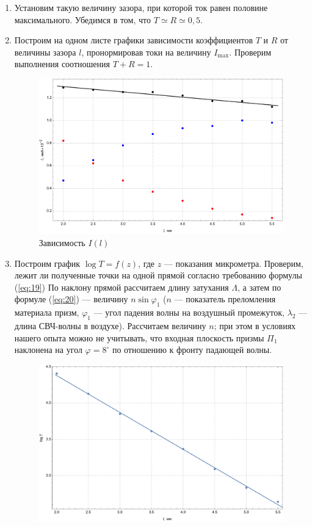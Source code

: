 \documentclass[a4paper, 12pt]{article}
\begin{document}
\begin{enumerate}
\begin{table}[h]
		\end{table}
		\item Установим такую величину зазора, при которой ток равен половине максимального. Убедимся в том, что $T\simeq R\simeq 0,5$.
		\item Построим на одном листе графики зависимости коэффициентов $T$ и $R$ от величины зазора $l$, пронормировав токи на величину $I_{\max}$. Проверим выполнения соотношения $T+R=1$.
		\begin{figure}[h]
			\centering
			\includegraphics[scale=0.57]{Graphic.pdf}
			\caption{Зависимость $I(l)$}
		\end{figure}
		\item Построим график $\log{T}=f\left(z\right)$, где $z$ — показания микрометра. Проверим, лежит ли полученные точки на одной прямой согласно требованию формулы (\ref{eq:19}) По наклону прямой рассчитаем длину затухания $\Lambda$, а затем по формуле (\ref{eq:20}) — величину $n\sin\varphi_1$ ($n$ — показатель преломления материала призм, $\varphi_1$ — угол падения волны на воздушный промежуток, $\lambda_2$ — длина СВЧ-волны в воздухе). Рассчитаем величину $n$; при этом в условиях нашего опыта можно не учитывать, что входная плоскость призмы $\Pi_1$ наклонена на угол $\varphi=8^\circ$ по отношению к фронту падающей волны.
		\newpage
		\begin{figure}[h]
			\centering
			\includegraphics[scale=0.57]{Graphic2.pdf}

\end{figure}
\end{enumerate}
\end{document}
